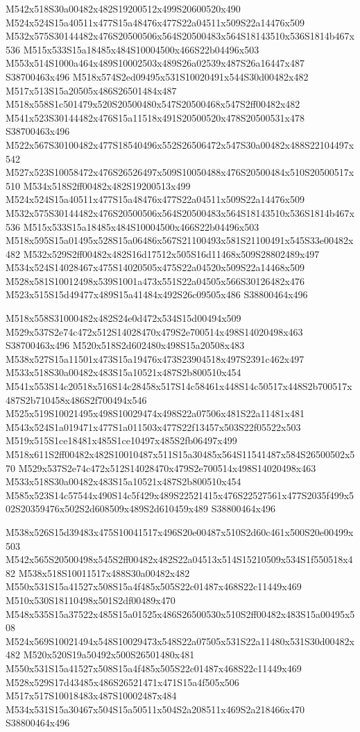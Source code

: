 \documentclass{article}
\begin{document}
\begin{multicols}{2}
M542x518S30a00482x482S19200512x499S20600520x490 M524x524S15a40511x477S15a48476x477S22a04511x509S22a14476x509 M532x575S30144482x476S20500506x564S20500483x564S18143510x536S1814b467x536 M515x533S15a18485x484S10004500x466S22b04496x503 M553x514S1000a464x489S10002503x489S26a02539x487S26a16447x487 S38700463x496 M518x574S2ed09495x531S10020491x544S30d00482x482 M517x513S15a20505x486S26501484x487 M518x558S1c501479x520S20500480x547S20500468x547S2ff00482x482 M541x523S30144482x476S15a11518x491S20500520x478S20500531x478 S38700463x496 M522x567S30100482x477S18540496x552S26506472x547S30a00482x488S22104497x542 M527x523S10058472x476S26526497x509S10050488x476S20500484x510S20500517x510 M534x518S2ff00482x482S19200513x499 M524x524S15a40511x477S15a48476x477S22a04511x509S22a14476x509 M532x575S30144482x476S20500506x564S20500483x564S18143510x536S1814b467x536 M515x533S15a18485x484S10004500x466S22b04496x503 M518x595S15a01495x528S15a06486x567S21100493x581S21100491x545S33e00482x482 M532x529S2ff00482x482S16d17512x505S16d11468x509S28802489x497 M534x524S14028467x475S14020505x475S22a04520x509S22a14468x509 M528x581S10012498x539S1001a473x551S22a04505x566S30126482x476 M523x515S15d49477x489S15a41484x492S26c09505x486 S38800464x496

M518x558S31000482x482S24e0d472x534S15d00494x509 M529x537S2e74c472x512S14028470x479S2e700514x498S14020498x463 S38700463x496 M520x518S2d602480x498S15a20508x483 M538x527S15a11501x473S15a19476x473S23904518x497S2391c462x497 M533x518S30a00482x483S15a10521x487S2b800510x454 M541x553S14c20518x516S14c28458x517S14c58461x448S14c50517x448S2b700517x487S2b710458x486S2f700494x546 M525x519S10021495x498S10029474x498S22a07506x481S22a11481x481 M543x524S1a019471x477S1a011503x477S22f13457x503S22f05522x503 M519x515S1ce18481x485S1ce10497x485S2fb06497x499 M518x611S2ff00482x482S10010487x511S15a30485x564S11541487x584S26500502x570 M529x537S2e74c472x512S14028470x479S2e700514x498S14020498x463 M533x518S30a00482x483S15a10521x487S2b800510x454 M585x523S14c57544x490S14c5f429x489S22521415x476S22527561x477S2035f499x502S20359476x502S2d608509x489S2d610459x489 S38800464x496

M538x526S15d39483x475S10041517x496S20e00487x510S2d60c461x500S20e00499x503 M542x565S20500498x545S2ff00482x482S22a04513x514S15210509x534S1f550518x482 M538x518S10011517x488S30a00482x482 M550x531S15a41527x508S15a4f485x505S22c01487x468S22c11449x469 M510x530S18110498x501S2df00489x470 M548x535S15a37522x485S15a01525x486S26500530x510S2ff00482x483S15a00495x508 M524x569S10021494x548S10029473x548S22a07505x531S22a11480x531S30d00482x482 M520x520S19a50492x500S26501480x481 M550x531S15a41527x508S15a4f485x505S22c01487x468S22c11449x469 M528x529S17d43485x486S26521471x471S15a4f505x506 M517x517S10018483x487S10002487x484 M534x531S15a30467x504S15a50511x504S2a208511x469S2a218466x470 S38800464x496


\end{multicols}
\end{document}
